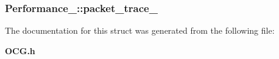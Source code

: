 \subsubsection[{packet\_\-trace\_\-}]{ {\bf Performance\_\-::packet\_\-trace\_\-}}\label{structPerformance___da810a7cfae1b27e33298678214f5b2d}




The documentation for this struct was generated from the following file:\begin{CompactItemize}
\item 
{\bf OCG.h}\end{CompactItemize}
